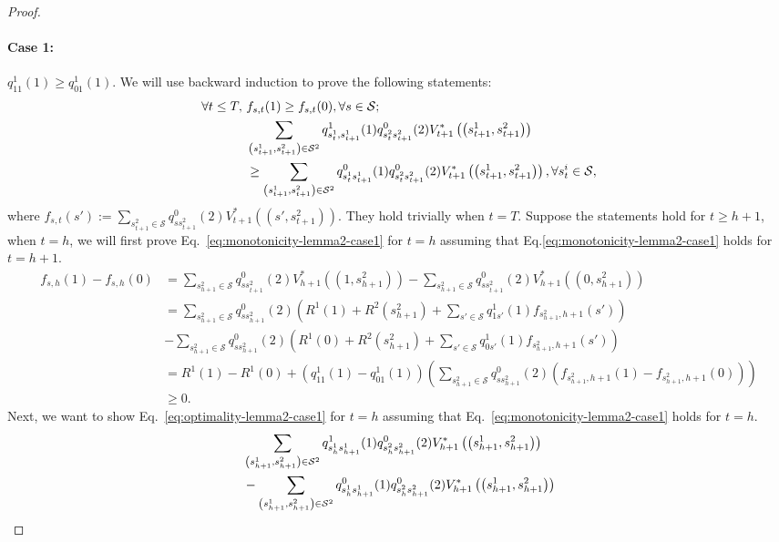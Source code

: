 \begin{proof}
    \paragraph{Case 1: } $q^1_{11}(1)\geq q^1_{01}(1)$. We will use backward induction to prove the following statements:
    \begin{align}
        \forall t\leq T,~&f_{s,t}(1)\geq f_{s,t}(0),\forall s\in\mathcal{S};\label{eq:monotonicity-lemma2-case1}\\
        &   \sum_{\left(s_{t+1}^1,s_{t+1}^2\right)\in\mathcal{S}^2}q^1_{s_t^1,s_{t+1}^1}(1)q^0_{s_t^2s_{t+1}^2}(2)V_{t+1}^*\left(\left(s_{t+1}^1,s_{t+1}^2\right)\right)\notag\\&\geq\sum_{\left(s_{t+1}^1,s_{t+1}^2\right)\in\mathcal{S}^2}q^0_{s_t^1s_{t+1}^1}(1)q^0_{s_t^2s_{t+1}^2}(2)V_{t+1}^*\left(\left(s_{t+1}^1,s_{t+1}^2\right)\right),\forall s_t^i\in\mathcal{S}\label{eq:optimality-lemma2-case1},
    \end{align}
    where $f_{s,t}\left(s'\right):=\sum_{s_{t+1}^2\in\mathcal{S}}q^0_{ss_{t+1}^2}\left(2\right)V_{t+1}^*\left(\left(s',s_{t+1}^2\right)\right)$. 
They hold trivially when $t=T$. Suppose the statements hold for $t\geq h+1$, when $t=h$, we will first prove Eq.~\eqref{eq:monotonicity-lemma2-case1} for $t=h$ assuming that Eq.\eqref{eq:monotonicity-lemma2-case1} holds for $t=h+1$. 
\begin{align*}
    f_{s,h}(1)-f_{s,h}(0)&=\sum_{s_{h+1}^2\in\mathcal{S}}q^0_{ss_{t+1}^2}\left(2\right)V_{h+1}^*\left(\left(1,s_{h+1}^2\right)\right)-\sum_{s_{h+1}^2\in\mathcal{S}}q^0_{ss_{t+1}^2}\left(2\right)V_{h+1}^*\left(\left(0,s_{h+1}^2\right)\right)\\
       &=\sum_{s_{h+1}^2\in\mathcal{S}}q^0_{ss_{h+1}^2}(2)\left(R^1(1)+R^2(s_{h+1}^2)+\sum_{s'\in\mathcal{S}}q^1_{1s'}(1)f_{s_{h+1}^2,h+1}(s')\right)\\
       &-\sum_{s_{h+1}^2\in\mathcal{S}}q^0_{ss_{h+1}^2}(2)\left(R^1(0)+R^2(s_{h+1}^2)+\sum_{s'\in\mathcal{S}}q^1_{0s'}(1)f_{s_{h+1}^2,h+1}(s')\right)\\
       &=R^1(1)-R^1(0)+\left(q^1_{11}(1)-q^1_{01}(1)\right)\left(\sum_{s_{h+1}^2\in\mathcal{S}}q^0_{ss_{h+1}^2}(2)\left(f_{s_{h+1}^2,h+1}(1)-f_{s_{h+1}^2,h+1}(0)\right)\right)\\
       &\geq 0.
\end{align*}
Next, we want to show Eq.~\eqref{eq:optimality-lemma2-case1} for $t=h$ assuming that Eq.~\eqref{eq:monotonicity-lemma2-case1} holds for $t=h$.
\begin{align*}
    &   \sum_{\left(s_{h+1}^1,s_{h+1}^2\right)\in\mathcal{S}^2}q^1_{s_h^1s_{h+1}^1}(1)q^0_{s_h^2s_{h+1}^2}(2)V_{h+1}^*\left(\left(s_{h+1}^1,s_{h+1}^2\right)\right)\notag\\&-\sum_{\left(s_{h+1}^1,s_{h+1}^2\right)\in\mathcal{S}^2}q^0_{s_h^1s_{h+1}^1}(1)q^0_{s_h^2s_{h+1}^2}(2)V_{h+1}^*\left(\left(s_{h+1}^1,s_{h+1}^2\right)\right)\\

\end{align*}
\end{proof}

